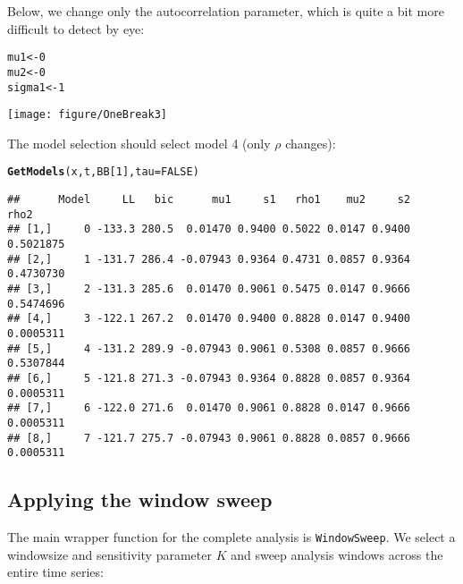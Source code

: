 \documentclass[10pt]{article}\usepackage[]{graphicx}\usepackage[]{color}
\makeatletter
\newcommand{\hlnum}[1]{\textcolor[rgb]{0.686,0.059,0.569}{#1}}%
\newcommand{\hlstd}[1]{\textcolor[rgb]{0.345,0.345,0.345}{#1}}%
\newcommand{\hlkwb}[1]{\textcolor[rgb]{0.69,0.353,0.396}{#1}}%
\newcommand{\hlkwc}[1]{\textcolor[rgb]{0.333,0.667,0.333}{#1}}%
\newcommand{\hlkwd}[1]{\textcolor[rgb]{0.737,0.353,0.396}{\textbf{#1}}}%
\newenvironment{kframe}{%
 \def\at@end@of@kframe{}%
 \ifinner\ifhmode%
  \def\at@end@of@kframe{\end{minipage}}%
  \begin{minipage}{\columnwidth}%
 \fi\fi%
 \def\FrameCommand##1{\hskip\@totalleftmargin \hskip-\fboxsep
 \colorbox{shadecolor}{##1}\hskip-\fboxsep
     \hskip-\linewidth \hskip-\@totalleftmargin \hskip\columnwidth}%
 \MakeFramed {\advance\hsize-\width
   \@totalleftmargin\z@ \linewidth\hsize
   \@setminipage}}%
 {\par\unskip\endMakeFramed%
 \at@end@of@kframe}
\newenvironment{knitrout}{}{} %
\newcommand{\bc}{\begin{center}}
\newcommand{\ec}{\end{center}}
\makeatother
\begin{document}
Below, we change only the autocorrelation parameter, which is quite a bit more difficult to detect by eye:
\bc
\begin{knitrout}
\color{fgcolor}\begin{kframe}
\begin{alltt}
\hlstd{mu1} \hlkwb{<-} \hlnum{0}
\hlstd{mu2} \hlkwb{<-} \hlnum{0}
\hlstd{sigma1} \hlkwb{<-} \hlnum{1}
\end{alltt}


{\ttfamily\noindent\color{warningcolor}{\#\# Warning: NA/Inf replaced by maximum positive value}}\end{kframe}
\texttt{[image: figure/OneBreak3]} 

\end{knitrout}

\ec
The model selection should select model 4 (only $\rho$ changes):

\begin{knitrout}
\color{fgcolor}\begin{kframe}
\begin{alltt}
\hlkwd{GetModels}\hlstd{(x, t, BB[}\hlnum{1}\hlstd{],} \hlkwc{tau} \hlstd{=} \hlnum{FALSE}\hlstd{)}
\end{alltt}
\begin{verbatim}
##      Model     LL   bic      mu1     s1   rho1    mu2     s2      rho2
## [1,]     0 -133.3 280.5  0.01470 0.9400 0.5022 0.0147 0.9400 0.5021875
## [2,]     1 -131.7 286.4 -0.07943 0.9364 0.4731 0.0857 0.9364 0.4730730
## [3,]     2 -131.3 285.6  0.01470 0.9061 0.5475 0.0147 0.9666 0.5474696
## [4,]     3 -122.1 267.2  0.01470 0.9400 0.8828 0.0147 0.9400 0.0005311
## [5,]     4 -131.2 289.9 -0.07943 0.9061 0.5308 0.0857 0.9666 0.5307844
## [6,]     5 -121.8 271.3 -0.07943 0.9364 0.8828 0.0857 0.9364 0.0005311
## [7,]     6 -122.0 271.6  0.01470 0.9061 0.8828 0.0147 0.9666 0.0005311
## [8,]     7 -121.7 275.7 -0.07943 0.9061 0.8828 0.0857 0.9666 0.0005311
\end{verbatim}
\end{kframe}
\end{knitrout}


\subsection{Applying the window sweep}

The main wrapper function for the complete analysis is \texttt{WindowSweep}.  We select a windowsize and sensitivity parameter $K$ and sweep analysis windows across the entire time series:
\end{document}
